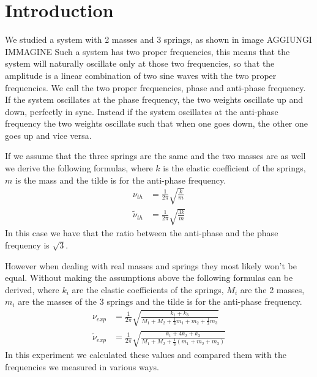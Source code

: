 \documentclass{article}
\begin{document}
\section{Introduction} \label{sec:intro}
We studied a system with 2 masses and 3 springs, as shown in image AGGIUNGI IMMAGINE
Such a system has two proper frequencies, this means that the system will naturally oscillate only at those two frequencies, so that the amplitude is a linear combination of two sine waves with the two proper frequencies. 
We call the two proper frequencies, phase and anti-phase frequency. If the system oscillates at the phase frequency, the two weights oscillate up and down, perfectly in sync. Instead if the system oscillates at the anti-phase frequency the two weights oscillate such that when one goes down, the other one goes up and vice versa. 

If we assume that the three springs are the same and the two masses are as well 
we derive the following formulas, where $k$ is the elastic coefficient of the springs, $m$ is the mass and the tilde is for the anti-phase frequency.
\begin{align}
    \nu_{th} &= \frac{1}{2\pi}   \sqrt{\frac{ k}{m}}
        \label{eq:nuth} \\
    \tilde \nu_{th} &= \frac{1}{2\pi}   \sqrt{\frac{3k}{m}}
        \label{eq:antinuth}
\end{align}
In this case we have that the ratio between the anti-phase and the phase frequency is $\sqrt 3$.

However when dealing with real masses and springs they most 
likely won't be equal. Without making the assumptions above 
the following formulas can be derived, where $k_i$ are the elastic coefficients of the springs, $M_i$ are the 2 masses, $m_i$ are the masses of the 3 springs and the tilde is for the anti-phase frequency.
\begin{align}
           \nu_{exp} &= \frac{1}{2\pi}   \sqrt{\frac{k_1+k_3}
           {M_1 + M_2 + \frac{1}{3} m_1 + m_2 + \frac{1}{3}m_3 }} 
           \label{eq:nuexp}  \\
    \tilde \nu_{exp} &= \frac{1}{2\pi}   \sqrt{\frac{k_1 +4k_2 +k_3}
           {M_1 + M_2 + \frac{1}{3} (m_1 + m_2 + m_3) }} 
           \label{eq:antinuexp} 
\end{align}
In this experiment we calculated these values and compared them with the frequencies we measured in various ways. 


\end{document}
